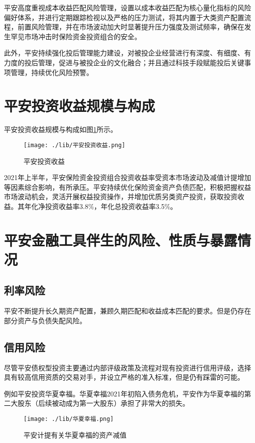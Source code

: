 \documentclass[11pt]{ctexart}
\begin{document}
平安高度重视成本收益匹配风险管理，设置以成本收益匹配为核心量化指标的风险偏好体系，并进行定期跟踪检视以及严格的压力测试，将其内置于大类资产配置流程，前置风险管理，并在市场波动加大时显著提升压力强度及测试频率，确保在发生罕见市场冲击时保险资金投资组合的安全。

此外，平安持续强化投后管理能力建设，对被投企业经营进行有深度、有细度、有力度的投后管理，促进与被投企业的文化融合；并且通过科技手段赋能投后关键事项管理，持续优化风险预警。
\section{平安投资收益规模与构成}
\label{sec:org37b072d}
平安投资收益规模与构成如图\ref{fig:revenue}所示。
\begin{figure}[htbp]
\centering
\texttt{[image: ./lib/平安投资收益.png]}
\caption{\label{fig:revenue}平安投资收益}
\end{figure}

2021年上半年，平安保险资金投资组合投资收益率受资本市场波动及减值计提增加等因素综合影响，有所承压。平安持续优化保险资金资产负债匹配，积极把握权益市场波动机会，灵活开展权益投资操作，并增加优质另类资产投资，获取投资收益。其年化净投资收益率3.8\%，年化总投资收益率3.5\%。
\section{平安金融工具伴生的风险、性质与暴露情况}
\label{sec:org687e1ae}
\subsection{利率风险}
\label{sec:org4a89a53}
平安不断提升长久期资产配置，兼顾久期匹配和收益成本匹配的要求。但是仍存在部分资产与负债失配风险。
\subsection{信用风险}
\label{sec:orgb0465c6}
尽管平安债权型投资主要通过内部评级政策及流程对现有投资进行信用评级，选择具有较高信用资质的交易对手，并设立严格的准入标准，但是仍有踩雷的可能。

例如平安投资华夏幸福。华夏幸福2021年初陷入债务危机，平安作为华夏幸福的第二大股东（后续被动成为第一大股东）承担了非常大的损失。
\begin{figure}[htbp]
\centering
\texttt{[image: ./lib/华夏幸福.png]}
\caption{\label{fig:huaxiaxingfu}平安计提有关华夏幸福的资产减值}
\end{figure}
\end{document}
